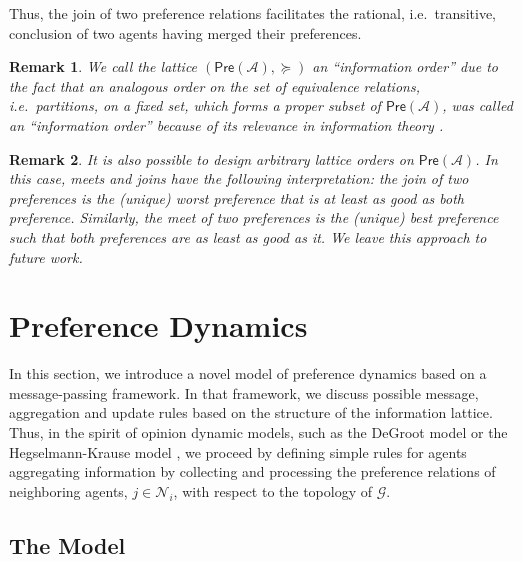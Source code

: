 \documentclass[conference]{ieeeconf}
\newcommand{\N}{\mathcal{N}}
\newcommand{\A}{\mathcal{A}}
\newcommand{\G}{\mathcal{G}}
\newcommand{\Pref}{\mathsf{Pre}}
\newtheorem{remark}{Remark}
\begin{document}
Thus, the join of two preference relations facilitates the rational, i.e.~transitive, conclusion of two agents having merged their preferences.

\begin{remark}
    We call the lattice $(\Pref(\A), \succeq)$ an ``information order'' due to the fact that an analogous order on the set of equivalence relations, i.e.~partitions, on a fixed set, which forms a proper subset of $\Pref(\A)$, was called an ``information order'' because of its relevance in information theory \cite{shannon}.
\end{remark}
\begin{remark}
    It is also possible to design arbitrary lattice orders on $\Pref(\A)$. In this case, meets and joins have the following interpretation: the join of two preferences is the (unique) worst preference that is at least as good as both preference. Similarly, the meet of two preferences is the (unique) best preference such that both preferences are as least as good as it. We leave this approach to future work.
\end{remark}


\section{Preference Dynamics}
\label{sec:dynamics}

In this section, we introduce a novel model of preference dynamics based on a message-passing framework. In that framework, we discuss possible message, aggregation and update rules based on the structure of the information lattice. Thus, in the spirit of opinion dynamic models, such as the DeGroot model \cite{degroot1974} or the Hegselmann-Krause model \cite{hegselmann2002}, we proceed by defining simple rules for agents aggregating information by collecting and processing the preference relations of neighboring agents, $j \in \N_i$, with respect to the topology of $\G$.

\subsection{The Model}
\end{document}
